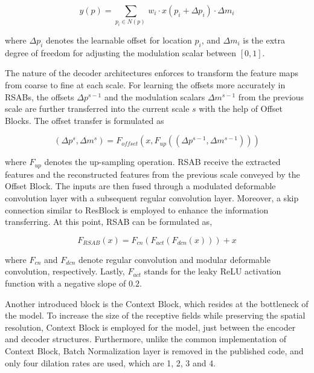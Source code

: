 \begin{equation}
    \label{eqn:deform}
    y(p)=\sum_{p_i\in N(p)\ }^{}w_i\cdot x(p_i+\Delta p_i)\cdot \Delta m_i
\end{equation}

where $\Delta p_i$ denotes the learnable offset for location $p_i$, and $\Delta m_i$ is the extra degree of freedom for adjusting the modulation scalar between $[0,1]$. 

The nature of the decoder architectures enforces to transform the feature maps from coarse to fine at each scale. For learning the offsets more accurately in RSABs, the offsets $\Delta p^{s-1}$ and the modulation scalars $\Delta m^{s-1}$ from the previous scale are further transferred into the current scale $s$ with the help of Offset Blocks. The offset transfer is formulated as  

\begin{equation}
    \label{eqn:offset}
    \left ( \Delta p^s,\Delta m^s \right ) = F_{offset}\left ( x, F_{up}\left ( \left ( \Delta p^{s-1},\Delta m^{s-1} \right ) \right ) \right )
\end{equation}

where $F_{up}$ denotes the up-sampling operation. RSAB receive the extracted features and the  reconstructed features  from  the  previous  scale conveyed by the Offset Block. The inputs are then fused through a modulated deformable convolution layer with a subsequent regular convolution layer. Moreover, a skip connection similar to ResBlock is employed to enhance the information transferring. At this point, RSAB can be formulated as,

\begin{equation}
    \label{eqn:RSAB}
    F_{RSAB}(x) = F_{cn}(F_{act}(F_{dcn}(x)))+x
\end{equation}

where $F_{cn}$ and $F_{dcn}$ denote regular convolution and modular deformable convolution, respectively. Lastly, $F_{act}$ stands for the leaky ReLU activation function \cite{Maas13rectifiernonlinearities} with a negative slope of $0.2$.

Another introduced block is the Context Block, which resides at the bottleneck of the model. To increase the size of the receptive fields while preserving the spatial resolution, Context Block is employed for the model, just between the encoder and decoder structures. Furthermore, unlike the common implementation of Context Block, Batch Normalization layer is removed in the published code, and only four dilation rates are used, which are 1, 2, 3 and 4.

